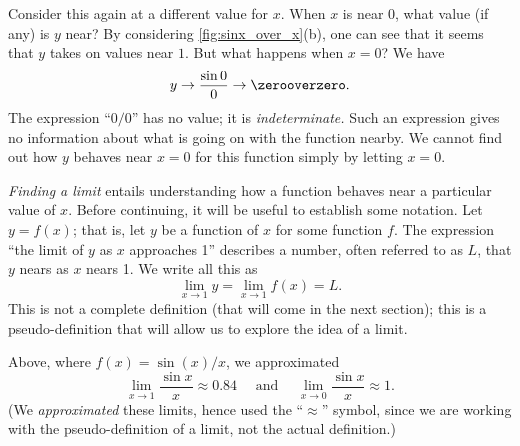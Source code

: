 Consider this again at a different value for $x$. When $x$ is near 0, what value (if any) is $y$ near? By considering \autoref{fig:sinx_over_x}(b), one can see that it seems that $y$ takes on values near $1$. But what happens when $x=0$? We have
\[y \rightarrow \frac{\sin 0}{0} \rightarrow \zerooverzero.\] 
The expression ``$0/0$'' has no value; it is \emph{indeterminate.}  Such an expression gives no information about what is going on with the function nearby. We cannot find out how $y$ behaves near $x=0$ for this function simply by letting $x=0$. 

\emph{Finding a limit} entails understanding how a function behaves near a particular value of $x$. Before continuing, it will be useful to establish some notation. Let $y=f(x)$; that is, let $y$ be a function of $x$ for some function $f$. The expression ``the limit of $y$ as $x$ approaches 1'' describes a number, often referred to as $L$, that $y$ nears as $x$ nears 1. We write all this as
\[\lim_{x\to 1} y = \lim_{x\to 1} f(x) = L.\]
This is not a complete definition (that will come in the next section); this is a pseudo-definition that will allow us to explore the idea of a limit. 

Above, where $f(x) = \sin(x)/x$, we approximated
\[\lim_{x\to 1} \frac{\sin x}{x} \approx 0.84 \quad \text{ and } \quad \lim_{x\to 0}\frac{\sin x}{x} \approx 1.\]
(We \textit{approximated} these limits, hence used the ``$\approx$'' symbol, since we are working with the pseudo-definition of a limit, not the actual definition.)


